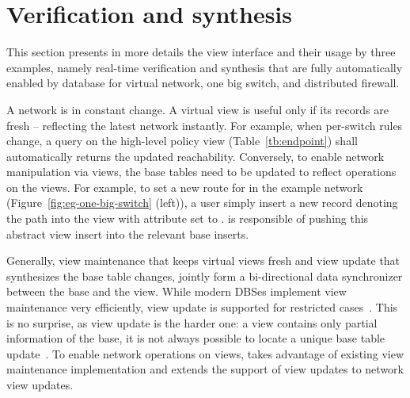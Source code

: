 \section{Verification and synthesis}
\label{sec:veri-syn}

This section presents in more details the view interface and their
usage by three examples, namely real-time verification and synthesis
that are fully automatically enabled by database for virtual network,
one big switch, and distributed firewall.




A network is in constant change. A virtual view is useful only if its
records are fresh -- reflecting the latest network instantly. For
example, when per-switch rules change, a query on the high-level
policy view  (Table~\ref{tb:endpoint}) shall
automatically returns the updated  reachability. Conversely,
to enable network manipulation via views, the base tables need to be
updated to reflect operations on the views.  For example, to set a new
route  for  in the example network
(Figure~\ref{fig:eg-one-big-switch} (left)), a user simply insert a
new record denoting the path into the  view with
 attribute set to . \Sys is responsible of pushing this
abstract view insert into the relevant base 
inserts.

Generally, view maintenance that keeps virtual views fresh and view
update that synthesizes the base table changes, jointly form a
bi-directional data synchronizer between the base and the view. While
modern DBSes implement view maintenance very efficiently, view update
is supported for restricted
cases~\cite{ak-view-udpate-thesis,relational-lenses}. This is no
surprise, as view update is the harder one: a view contains only
partial information of the base, it is not always possible to locate a
unique base table update~\cite{Bancilhon:view-update-semantics}. To
enable network operations on views, \Sys takes advantage of existing
view maintenance implementation and extends the support of view
updates to network view updates.

